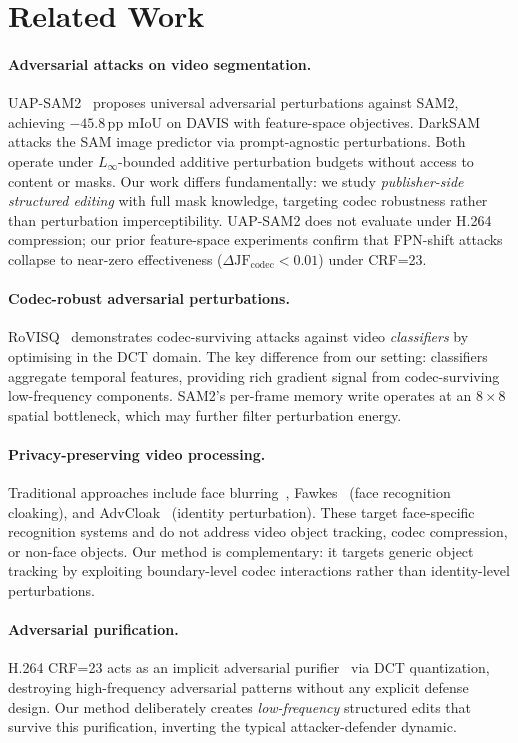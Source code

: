 \section{Related Work}
\label{sec:related}

\paragraph{Adversarial attacks on video segmentation.}
UAP-SAM2~\citep{uap_sam2_2025} proposes universal adversarial perturbations against SAM2, achieving $-45.8$\,pp mIoU on DAVIS with feature-space objectives.
DarkSAM~\citep{darksam2024} attacks the SAM image predictor via prompt-agnostic perturbations.
Both operate under $L_\infty$-bounded additive perturbation budgets without access to content or masks.
Our work differs fundamentally: we study \emph{publisher-side structured editing} with full mask knowledge, targeting codec robustness rather than perturbation imperceptibility.
UAP-SAM2 does not evaluate under H.264 compression; our prior feature-space experiments confirm that FPN-shift attacks collapse to near-zero effectiveness ($\Delta\mathrm{JF}_\mathrm{codec} < 0.01$) under CRF=23.

\paragraph{Codec-robust adversarial perturbations.}
RoVISQ~\citep{rovisq2023} demonstrates codec-surviving attacks against video \emph{classifiers} by optimising in the DCT domain.
The key difference from our setting: classifiers aggregate temporal features, providing rich gradient signal from codec-surviving low-frequency components.
SAM2's per-frame memory write operates at an $8{\times}8$ spatial bottleneck, which may further filter perturbation energy.

\paragraph{Privacy-preserving video processing.}
Traditional approaches include face blurring~\citep{mcpherson2016defeating}, Fawkes~\citep{shan2020fawkes} (face recognition cloaking), and AdvCloak~\citep{advcloak} (identity perturbation).
These target face-specific recognition systems and do not address video object tracking, codec compression, or non-face objects.
Our method is complementary: it targets generic object tracking by exploiting boundary-level codec interactions rather than identity-level perturbations.

\paragraph{Adversarial purification.}
H.264 CRF=23 acts as an implicit adversarial purifier~\citep{yoon2021adv_purification,diffpure2022} via DCT quantization, destroying high-frequency adversarial patterns without any explicit defense design.
Our method deliberately creates \emph{low-frequency} structured edits that survive this purification, inverting the typical attacker-defender dynamic.
